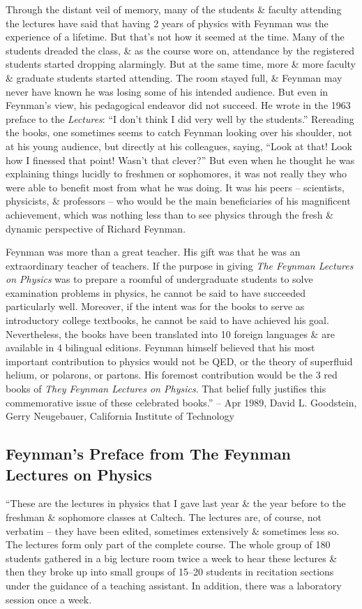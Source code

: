 \documentclass{article}
\begin{document}
Through the distant veil of memory, many of the students \& faculty attending the lectures have said that having 2 years of physics with {\sc Feynman} was the experience of a lifetime. But that's not how it seemed at the time. Many of the students dreaded the class, \& as the course wore on, attendance by the registered students started dropping alarmingly. But at the same time, more \& more faculty \& graduate students started attending. The room stayed full, \& {\sc Feynman} may never have known he was losing some of his intended audience. But even in {\sc Feynman}'s view, his pedagogical endeavor did not succeed. He wrote in the 1963 preface to the {\it Lectures}: ``I don't think I did very well by the students.'' Rereading the books, one sometimes seems to catch {\sc Feynman} looking over his shoulder, not at his young audience, but directly at his colleagues, saying, ``Look at that! Look how I finessed that point! Wasn't that clever?'' But even when he thought he was explaining things lucidly to freshmen or sophomores, it was not really they who were able to benefit most from what he was doing. It was his peers -- scientists, physicists, \& professors -- who would be the main beneficiaries of his magnificent achievement, which was nothing less than to see physics through the fresh \& dynamic perspective of {\sc Richard Feynman}.

{\sc Feynman} was more than a great teacher. His gift was that he was an extraordinary teacher of teachers. If the purpose in giving {\it The Feynman Lectures on Physics} was to prepare a roomful of undergraduate students to solve examination problems in physics, he cannot be said to have succeeded particularly well. Moreover, if the intent was for the books to serve as introductory college textbooks, he cannot be said to have achieved his goal. Nevertheless, the books have been translated into 10 foreign languages \& are available in 4 bilingual editions. {\sc Feynman} himself believed that his most important contribution to physics would not be QED, or the theory of superfluid helium, or polarons, or partons. His foremost contribution would be the 3 red books of {\it They Feynman Lectures on Physics}. That belief fully justifies this commemorative issue of these celebrated books.'' -- Apr 1989, {\sc David L. Goodstein, Gerry Neugebauer}, California Institute of Technology

\subsection{{\sc Feynman}'s Preface from The Feynman Lectures on Physics}
``These are the lectures in physics that I gave last year \& the year before to the freshman \& sophomore classes at Caltech. The lectures are, of course, not verbatim -- they have been edited, sometimes extensively \& sometimes less so. The lectures form only part of the complete course. The whole group of 180 students gathered in a big lecture room twice a week to hear these lectures \& then they broke up into small groups of 15--20 students in recitation sections under the guidance of a teaching assistant. In addition, there was a laboratory session once a week.
\end{document}
